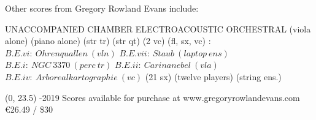 \documentclass[11pt]{article}
\begin{document}

\begin{center}
\fontsize{.6cm}{1em}\selectfont Other scores from Gregory Rowland Evans include: \hfill
\end{center}
\vspace*{4\baselineskip}
{
\begin{center}
\setlength{\columnseprule}{1pt}
\setlength{\columnsep}{6em}

\begin{paracol}{4}
\fontsize{.3cm}{1em}\selectfont UNACCOMPANIED
\switchcolumn[1]
\fontsize{.3cm}{1em}\selectfont CHAMBER
\switchcolumn[2]
\fontsize{.3cm}{1em}\selectfont ELECTROACOUSTIC
\switchcolumn[3]
\fontsize{.3cm}{1em}\selectfont ORCHESTRAL
\switchcolumn[0]
\fontsize{.1cm}{0.5em}  (viola alone)
\switchcolumn[0]
\fontsize{.1cm}{0.5em}  (piano alone)
\switchcolumn[1]
\fontsize{.1cm}{0.5em} 
\switchcolumn[1]
\fontsize{.1cm}{0.5em}  (str tr)
\switchcolumn[1]
\fontsize{.1cm}{0.5em}  (str qt)
\switchcolumn[1]
\fontsize{.1cm}{0.5em}  (2 vc)
\switchcolumn[1]
\fontsize{.1cm}{0.5em}  (fl, sx, vc)
\switchcolumn[2]
\fontsize{.1cm}{0.5em} :
\switchcolumn[2]
\fontsize{.05cm}{0.5em}  $B.E.vi: \ Ohrenquallen \ (vln)$
\switchcolumn[2]
\fontsize{.05cm}{0.5em}  $B.E.vii: \ Staub \ (laptop \ ens)$
\switchcolumn[2]
\fontsize{.05cm}{0.5em}  $B.E.i: \ NGC \ 3370 \ (perc \ tr)$
\switchcolumn[2]
\fontsize{.05cm}{0.5em}  $B.E.ii: \ Carinanebel \ (vla)$
\switchcolumn[2]
 \fontsize{.05cm}{0.5em} $B.E.iv: \ Arborealkartographie \ (vc)$
\switchcolumn[3]
\fontsize{.1cm}{0.5em} 
\switchcolumn[3]
\fontsize{.1cm}{0.5em}  (21 sx)
\switchcolumn[3]
\fontsize{.1cm}{0.5em}  (twelve players)
\switchcolumn[3]
\fontsize{.1cm}{0.5em}  (string ens.)


\end{paracol}
\end{center}
}

\begin{textblock}{23}(0, 23.5)
-2019 \hfill
Scores available for purchase at www.gregoryrowlandevans.com \hfill
\euro 26.49 / \$30
\end{textblock}
\end{document}

